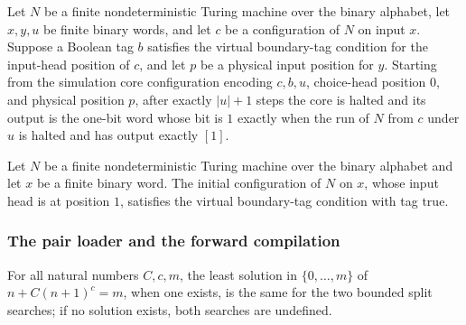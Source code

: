 \begin{lemma}
\label{Complexity.choiceCore_timed}
\leanok
{}
Let $N$ be a finite nondeterministic Turing machine over the binary alphabet, let
$x,y,u$ be finite binary words, and let $c$ be a configuration of $N$ on input $x$.
Suppose a Boolean tag $b$ satisfies the virtual boundary-tag condition for the
input-head position of $c$, and let $p$ be a physical input position for $y$. Starting
from the simulation core configuration encoding $c,b,u$, choice-head position $0$, and
physical position $p$, after exactly $|u|+1$ steps the core is halted and its output is
the one-bit word whose bit is $1$ exactly when the run of $N$ from $c$ under $u$ is
halted and has output exactly $[1]$.
\end{lemma}

\begin{lemma}
\label{Complexity.choiceCore_initial_tag}
\leanok
{}
Let $N$ be a finite nondeterministic Turing machine over the binary alphabet and let $x$
be a finite binary word. The initial configuration of $N$ on $x$, whose input head is at
position $1$, satisfies the virtual boundary-tag condition with tag $\mathrm{true}$.
\end{lemma}

\subsubsection{The pair loader and the forward compilation}

\begin{lemma}
\label{Complexity.cont_split_bridge}
\leanok
{}
For all natural numbers $C,c,m$, the least solution in $\{0,\ldots,m\}$ of
$n+C(n+1)^c=m$, when one exists, is the same for the two bounded split searches; if no
solution exists, both searches are undefined.
\end{lemma}

